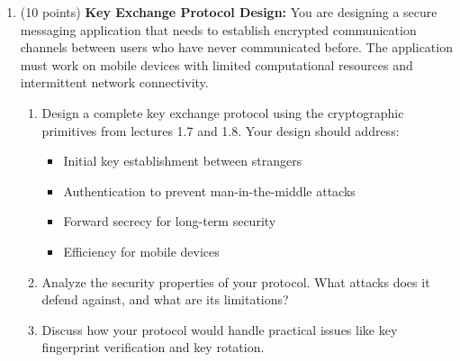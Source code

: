 \documentclass[10pt,a4paper,american]{exam}
\begin{document}
\begin{enumerate}
	\item (10 points) \textbf{Key Exchange Protocol Design:}
	      You are designing a secure messaging application that needs to establish encrypted communication channels between users who have never communicated before. The application must work on mobile devices with limited computational resources and intermittent network connectivity.
	      \begin{enumerate}
		      \item Design a complete key exchange protocol using the cryptographic primitives from lectures 1.7 and 1.8. Your design should address:
		            \begin{itemize}
			            \item Initial key establishment between strangers
			            \item Authentication to prevent man-in-the-middle attacks
			            \item Forward secrecy for long-term security
			            \item Efficiency for mobile devices
		            \end{itemize}
		      \item Analyze the security properties of your protocol. What attacks does it defend against, and what are its limitations?
		      \item Discuss how your protocol would handle practical issues like key fingerprint verification and key rotation.
	      \end{enumerate}


\end{enumerate}
\end{document}
